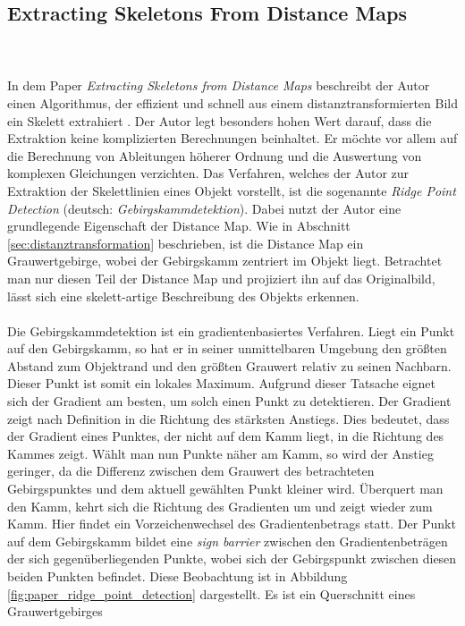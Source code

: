 \subsection{Extracting Skeletons From Distance Maps}
\\\\ 
In dem Paper \emph{Extracting Skeletons from Distance Maps} beschreibt der Autor einen Algorithmus, der effizient und schnell
aus einem distanztransformierten Bild ein Skelett extrahiert \cite{extracting_skeletons_distancemaps}. Der Autor legt besonders hohen Wert darauf, dass die Extraktion keine komplizierten Berechnungen beinhaltet. Er möchte vor allem auf die Berechnung
von Ableitungen höherer Ordnung und die Auswertung von komplexen Gleichungen verzichten. Das Verfahren, welches der Autor zur 
Extraktion der Skelettlinien eines Objekt vorstellt, ist die sogenannte \emph{Ridge Point Detection} (deutsch: \emph{Gebirgskammdetektion}). Dabei nutzt der Autor eine grundlegende Eigenschaft der Distance Map. Wie in Abschnitt \ref{sec:distanztransformation} beschrieben, ist die Distance Map ein Grauwertgebirge, wobei der Gebirgskamm zentriert im Objekt liegt. Betrachtet man nur diesen Teil der Distance Map und projiziert ihn auf das Originalbild, 
lässt sich eine skelett-artige Beschreibung des Objekts erkennen.\\\\
Die Gebirgskammdetektion ist ein gradientenbasiertes Verfahren. Liegt ein Punkt auf den Gebirgskamm, so hat er in 
seiner unmittelbaren Umgebung den größten Abstand zum Objektrand und den größten Grauwert relativ zu seinen Nachbarn. Dieser Punkt ist somit ein lokales Maximum. Aufgrund dieser Tatsache eignet  sich der Gradient am besten, um solch einen Punkt zu detektieren. Der Gradient zeigt nach Definition in die Richtung des stärksten Anstiegs. Dies bedeutet, dass der Gradient eines Punktes, der nicht auf dem Kamm liegt, in die Richtung des Kammes zeigt. Wählt man nun Punkte näher am Kamm, so wird der Anstieg
geringer, da die Differenz zwischen dem Grauwert des betrachteten Gebirgspunktes und dem aktuell gewählten Punkt kleiner wird. Überquert man den Kamm, kehrt sich die Richtung des Gradienten um und zeigt wieder zum Kamm. Hier findet ein Vorzeichenwechsel des Gradientenbetrags statt. Der Punkt auf dem Gebirgskamm bildet eine \emph{sign barrier} zwischen den Gradientenbeträgen der sich gegenüberliegenden Punkte, wobei sich der Gebirgspunkt zwischen diesen beiden Punkten befindet. Diese
Beobachtung ist in Abbildung \ref{fig:paper_ridge_point_detection} dargestellt. Es ist ein Querschnitt eines Grauwertgebirges
